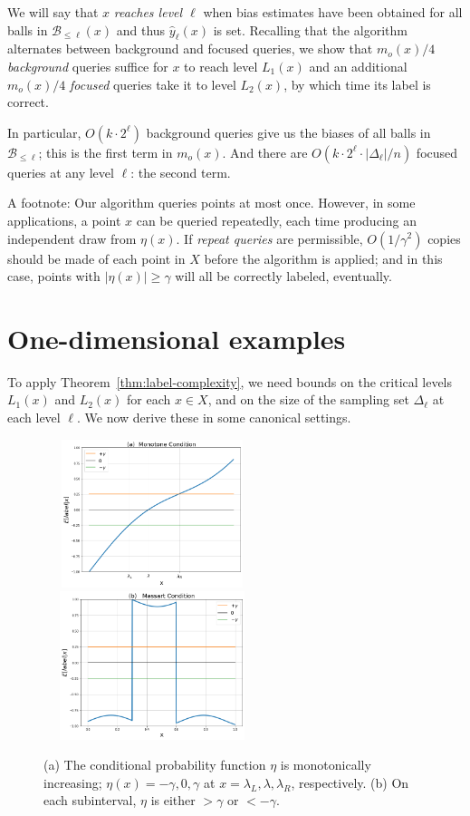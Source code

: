 \documentclass[twoside]{article}
\def\B{{\mathcal B}}
\def\yh{{\widehat{y}}}
\begin{document}
We will say that $x$ \emph{reaches level $\ell$} when bias estimates have been obtained for all balls in $\B_{\leq \ell}(x)$ and thus $\yh_\ell(x)$ is set. Recalling that the algorithm alternates between background and focused queries, we show that $m_o(x)/4$ \emph{background} queries suffice for $x$ to reach level $L_1(x)$ and an additional $m_o(x)/4$ \emph{focused} queries take it to level $L_2(x)$, by which time its label is correct.

In particular, $O(k \cdot 2^\ell)$ background queries give us the biases of all balls in $\B_{\leq \ell}$; this is the first term in $m_o(x)$. And there are $O(k \cdot 2^\ell \cdot |\Delta_\ell|/n)$ focused queries at any level $\ell$: the second term.

A footnote: Our algorithm queries points at most once. However, in some applications, a point $x$ can be queried repeatedly, each time producing an independent draw from $\eta(x)$. If \emph{repeat queries} are permissible, $O(1/\gamma^2)$ copies should be made of each point in $X$ before the algorithm is applied; and in this case, points with $|\eta(x)| \geq \gamma$ will all be correctly labeled, eventually.



\section{One-dimensional examples}

To apply Theorem~\ref{thm:label-complexity}, we need bounds on the critical levels $L_1(x)$ and $L_2(x)$ for each $x \in X$, and on the size of the sampling set $\Delta_\ell$ at each level $\ell$. We now derive these in some canonical settings.

\begin{figure}[t]
\begin{center}
  \includegraphics[width=2.5in,height=1.7in]{figures/Monotone.png}
\includegraphics[width=2.5in,height=1.7in]{figures/Massart.png}
\end{center}
\caption{(a) The conditional probability function $\eta$ is monotonically increasing; $\eta(x) = -\gamma, 0, \gamma$ at $x = \lambda_L, \lambda, \lambda_R$, respectively. (b) On each subinterval, $\eta$ is either $> \gamma$ or $<-\gamma$.}
\label{fig:oned}
\end{figure}
\end{document}
